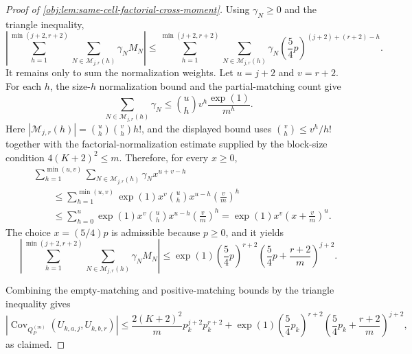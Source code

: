 \documentclass[11pt]{article}
\begin{document}
\begin{proof}[Proof of \cref{obj:lem:same-cell-factorial-cross-moment}]
Using \(\gamma_N\ge0\) and the triangle inequality,
\[
\left|
\sum_{h=1}^{\min(j+2,r+2)}
\sum_{N\in\mathcal M_{j,r}(h)}
\gamma_NM_N
\right|
\le
\sum_{h=1}^{\min(j+2,r+2)}
\sum_{N\in\mathcal M_{j,r}(h)}
\gamma_N
\left(\frac54p\right)^{(j+2)+(r+2)-h}.
\]
It remains only to sum the normalization weights.  Let \(u=j+2\) and \(v=r+2\). For each \(h\), the size-\(h\) normalization bound and the partial-matching count give
\[
\sum_{N\in\mathcal M_{j,r}(h)}\gamma_N
\le
\binom{u}{h}v^h\frac{\exp(1)}{m^h}.
\]
Here \(|\mathcal M_{j,r}(h)|=\binom{u}{h}\binom{v}{h}h!\), and the displayed bound uses \(\binom{v}{h}\le v^h/h!\) together with the factorial-normalization estimate supplied by the block-size condition \(4(K+2)^2\le m\). Therefore, for every \(x\ge0\),
\[
\begin{aligned}
&\sum_{h=1}^{\min(u,v)}
\sum_{N\in\mathcal M_{j,r}(h)}
\gamma_N x^{u+v-h} \\
&\qquad\le
\sum_{h=1}^{\min(u,v)}
\exp(1)x^v\binom{u}{h}x^{u-h}\left(\frac{v}{m}\right)^h \\
&\qquad\le
\sum_{h=0}^{u}
\exp(1)x^v\binom{u}{h}x^{u-h}\left(\frac{v}{m}\right)^h
=
\exp(1)x^v\left(x+\frac{v}{m}\right)^u.
\end{aligned}
\]
The choice \(x=(5/4)p\) is admissible because \(p\ge0\), and it yields
\[
\left|
\sum_{h=1}^{\min(j+2,r+2)}
\sum_{N\in\mathcal M_{j,r}(h)}
\gamma_NM_N
\right|
\le
\exp(1)\left(\frac54p\right)^{r+2}
\left(\frac54p+\frac{r+2}{m}\right)^{j+2}.
\]

Combining the empty-matching and positive-matching bounds by the triangle inequality gives
\[
\left|\operatorname{Cov}_{Q_P^{(m)}}(U_{k,a,j},U_{k,b,r})\right|
\le
\frac{2(K+2)^2}{m}p_k^{j+2}p_k^{r+2}
+
\exp(1)\left(\frac54p_k\right)^{r+2}
\left(\frac54p_k+\frac{r+2}{m}\right)^{j+2},
\]
as claimed.
\end{proof}
\end{document}
